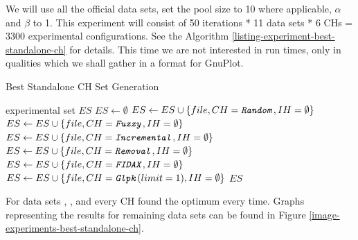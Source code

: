 We will use all the official data sets, set the pool size to 10 where applicable, $\alpha$ and $\beta$ to 1. This experiment will consist of 50 iterations * 11 data sets * 6 CHs = 3300 experimental configurations. See the Algorithm \ref{listing-experiment-best-standalone-ch} for details. This time we are not interested in run times, only in qualities which we shall gather in a format for GnuPlot.\\

\begin{algorithm}
\caption{Best Standalone CH Set Generation}
\label{listing-experiment-best-standalone-ch}
\begin{algorithmic}
\ENSURE experimental set $ES$
\STATE $ES \gets \emptyset$
    	\STATE $ES \gets ES \cup \{file, CH = \texttt{\textit{Random}}, IH = \emptyset\}$
    	\STATE $ES \gets ES \cup \{file, CH = \texttt{\textit{Fuzzy}}, IH = \emptyset\}$
    	\STATE $ES \gets ES \cup \{file, CH = \texttt{\textit{Incremental}}, IH = \emptyset\}$
    	\STATE $ES \gets ES \cup \{file, CH = \texttt{\textit{Removal}}, IH = \emptyset\}$
    	\STATE $ES \gets ES \cup \{file, CH = \texttt{\textit{FIDAX}}, IH = \emptyset\}$
    	\STATE $ES \gets ES \cup \{file, CH = \texttt{\textit{Glpk}}(limit = 1), IH = \emptyset\}$
  \ENDFOR
\ENDFOR
\RETURN $ES$
\end{algorithmic}
\end{algorithm}

For data sets , ,  and  every CH found the optimum every time. Graphs representing the results for remaining data sets can be found in Figure \ref{image-experiments-best-standalone-ch}.

